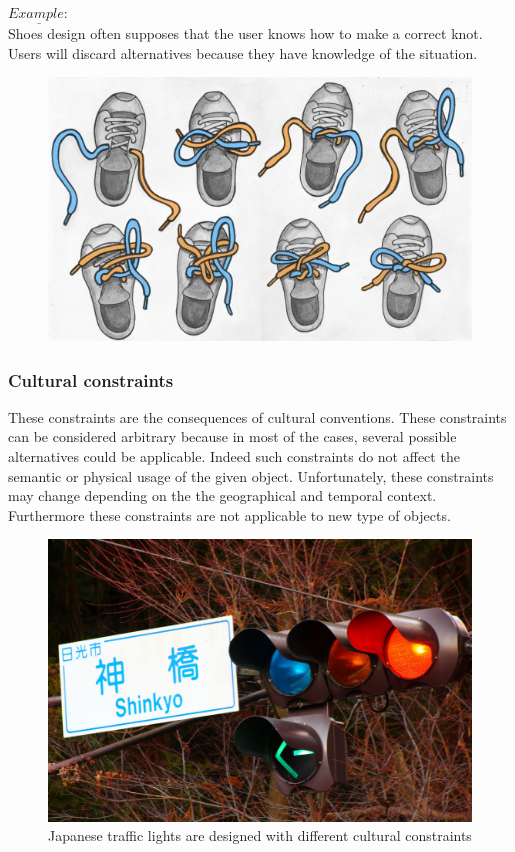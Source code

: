 \documentclass[a4paper,11pt] {article}
\theoremstyle{definition}
\begin{document}
        $\underline{Example:}$\\
        Shoes design often supposes that the user knows how to make a correct knot. Users will discard alternatives because they have knowledge of the situation.

        \begin{figure}[h]
        \centering
        \includegraphics[scale=0.3]{fig-report/tie_your_shoes.jpg}
        \end{figure}

        \subsubsection{Cultural constraints}
        These constraints are the consequences of cultural conventions. These constraints can be considered arbitrary because in most of the cases, several possible alternatives could be applicable. Indeed such constraints do not affect the semantic or physical usage of the given object. Unfortunately, these constraints may change depending on the the geographical and temporal context. Furthermore these constraints are not applicable to new type of objects.\\

        \begin{figure}[h]
        \centering
        \includegraphics[scale=0.1]{fig-report/japan-traffic-light.jpg}
        \caption{Japanese traffic lights are designed with different cultural constraints}
        \label{fig:cultural-constr-traffic-light}
        \end{figure}
\end{document}
